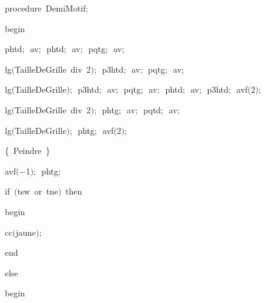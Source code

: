 {\pagebreak[3] 
\vspace{\neglskip}\mbox{\blc  \blk\idt  \mcl procedure\idt \ DemiMotif$;$}\par 
\vspace{\neglskip}\mbox{\blc  \blk\idt  \mcl begin\idt }\par 
\vspace{\neglskip}\mbox{\blc  \blk\blk\idt  phtd$;$\ av$;$\ phtd$;$\ av$;$\ pqtg$;$\ av$;$\ }\par 
\vspace{\neglskip}\mbox{\blc  \blk\blk\idt  lg$($TailleDeGrille\ \mcl div\idt \ 2$)$$;$\ p3htd$;$\ av$;$\ pqtg$;$\ av$;$}\par 
\vspace{\neglskip}\mbox{\blc  \blk\blk\idt  lg$($TailleDeGrille$)$$;$\ p3htd$;$\ av$;$\ pqtg$;$\ av$;$\ phtd$;$\ av$;$\ p3htd$;$\ avf$($2$)$$;$}\par 
\vspace{\neglskip}\mbox{\blc  \blk\blk\idt  lg$($TailleDeGrille\ \mcl div\idt \ 2$)$$;$\ phtg$;$\ av$;$\ pqtd$;$\ av$;$}\par 
\vspace{\neglskip}\mbox{\blc  \blk\blk\idt  lg$($TailleDeGrille$)$$;$\ phtg$;$\ avf$($2$)$$;$}\par 
\vspace{\neglskip}\mbox{\blc  \blk\blk\idt  \cmt  \{\ Peindre\ \}\idt }\par 
\vspace{\neglskip}\mbox{\blc  \blk\blk\idt  avf$($$-$1$)$$;$\ phtg$;$\ }\par 
\pagebreak[3] 
\vspace{\neglskip}\mbox{\blc  \blk\blk\idt  \mcl if\idt \ $($tsw\ \mcl or\idt \ tne$)$\ \mcl then\idt \ }\par 
\vspace{\neglskip}\mbox{\blc  \blk\blk\blk\idt  \mcl begin\idt \ }\par 
\vspace{\neglskip}\mbox{\blc  \blk\blk\blk\blk\idt  cc$($jaune$)$$;$\ }\par 
\vspace{\neglskip}\mbox{\blc  \blk\blk\blk\idt  \mcl end\idt \ }\par 
\pagebreak[3] 
\vspace{\neglskip}\mbox{\blc  \blk\blk\idt  \mcl else\idt }\par 
\vspace{\neglskip}\mbox{\blc  \blk\blk\blk\idt  \mcl begin\idt }\par 
}
